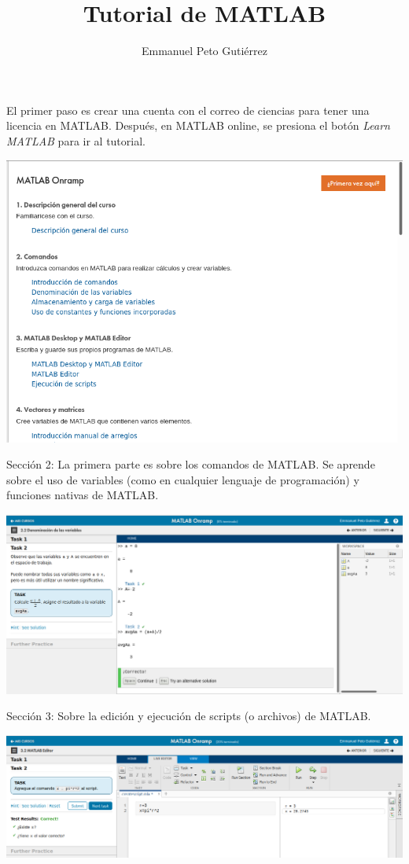 \documentclass{article}
\title{Tutorial de MATLAB}
\author{Emmanuel Peto Gutiérrez}
\begin{document}
\maketitle

El primer paso es crear una cuenta con el correo de ciencias para tener una licencia en MATLAB. Después, en MATLAB online, se presiona el botón \textit{Learn MATLAB} para ir al tutorial.

\includegraphics[width=\linewidth]{imagenes/1}

Sección 2: La primera parte es sobre los comandos de MATLAB. Se aprende sobre el uso de variables (como en cualquier lenguaje de programación) y funciones nativas de MATLAB.

\includegraphics[width=\linewidth]{imagenes/2}

Sección 3: Sobre la edición y ejecución de scripts (o archivos) de MATLAB.

\includegraphics[width=\linewidth]{imagenes/3}
\end{document}
